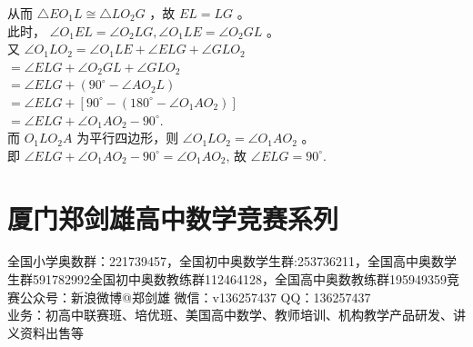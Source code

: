 \documentclass[10pt]{article}
\begin{document}
从而 $\triangle E O_{1} L \cong \triangle L O_{2} G$ ，故 $E L=L G$ 。\\
此时， $\angle O_{1} E L=\angle O_{2} L G, \angle O_{1} L E=\angle O_{2} G L$ 。\\
又 $\angle O_{1} L O_{2}=\angle O_{1} L E+\angle E L G+\angle G L O_{2}$\\
$=\angle E L G+\angle O_{2} G L+\angle G L O_{2}$\\
$=\angle E L G+\left(90^{\circ}-\angle A O_{2} L\right)$\\
$=\angle E L G+\left[90^{\circ}-\left(180^{\circ}-\angle O_{1} A O_{2}\right)\right]$\\
$=\angle E L G+\angle O_{1} A O_{2}-90^{\circ}$.\\
而 $O_{1} L O_{2} A$ 为平行四边形，则 $\angle O_{1} L O_{2}=\angle O_{1} A O_{2}$ 。\\
即 $\angle E L G+\angle O_{1} A O_{2}-90^{\circ}=\angle O_{1} A O_{2}$, 故 $\angle E L G=90^{\circ}$.

\section*{厦门郑剑雄高中数学竞赛系列}
全国小学奥数群：221739457，全国初中奥数学生群:253736211，全国高中奥数学生群591782992全国初中奥数教练群112464128，全国高中奥数教练群195949359竞赛公众号：新浪微博@郑剑雄 微信：v136257437 QQ：136257437\\
业务：初高中联赛班、培优班、美国高中数学、教师培训、机构教学产品研发、讲义资料出售等
\end{document}
